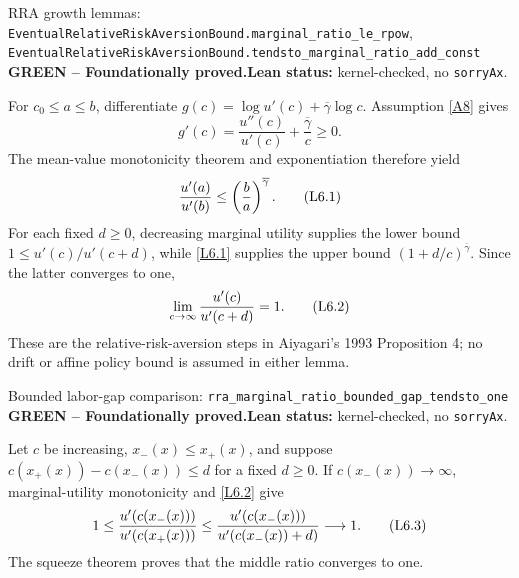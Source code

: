 \documentclass[11pt]{article}
\newcommand{\leanname}[1]{\nolinkurl{#1}}
\newcommand{\eqL}[1]{\refstepcounter{equation}\tag{L#1}}
\newcommand{\formalcheck}{\textbf{Lean status:} kernel-checked, no \texttt{sorryAx}.}
\newcommand{\greenstatus}{\textcolor{proved}{\textbf{GREEN -- Foundationally proved.}}}
\begin{document}
\begin{greenbox}{RRA growth lemmas:
\leanname{EventualRelativeRiskAversionBound.marginal_ratio_le_rpow},
\leanname{EventualRelativeRiskAversionBound.tendsto_marginal_ratio_add_const}}
\greenstatus\quad\formalcheck

For $c_0\le a\le b$, differentiate
$g(c)=\log u'(c)+\overline\gamma\log c$.  Assumption \eqref{A8}
gives
\[
 g'(c)=\frac{u''(c)}{u'(c)}+\frac{\overline\gamma}{c}\ge0.
\]
The mean-value monotonicity theorem and exponentiation therefore yield
\begin{equation}
 \frac{u'(a)}{u'(b)}\le
 \left(\frac ba\right)^{\overline\gamma}.
 \eqL{6.1}\label{L6.1}
\end{equation}
For each fixed $d\ge0$, decreasing marginal utility supplies the lower bound
$1\le u'(c)/u'(c+d)$, while \eqref{L6.1} supplies the upper bound
$(1+d/c)^{\overline\gamma}$.  Since the latter converges to one,
\begin{equation}
 \lim_{c\to\infty}\frac{u'(c)}{u'(c+d)}=1.
 \eqL{6.2}\label{L6.2}
\end{equation}
These are the relative-risk-aversion steps in Aiyagari's 1993 Proposition 4;
no drift or affine policy bound is assumed in either lemma.
\end{greenbox}
\begin{greenbox}{Bounded labor-gap comparison:
\leanname{rra_marginal_ratio_bounded_gap_tendsto_one}}
\greenstatus\quad\formalcheck

Let $c$ be increasing, $x_-(x)\le x_+(x)$, and suppose
$c(x_+(x))-c(x_-(x))\le d$ for a fixed $d\ge0$.  If
$c(x_-(x))\to\infty$, marginal-utility monotonicity and \eqref{L6.2} give
\begin{equation}
 1\le \frac{u'(c(x_-(x)))}{u'(c(x_+(x)))}
 \le \frac{u'(c(x_-(x)))}{u'(c(x_-(x))+d)}\longrightarrow1.
 \eqL{6.3}\label{L6.3}
\end{equation}
The squeeze theorem proves that the middle ratio converges to one.
\end{greenbox}
\end{document}
